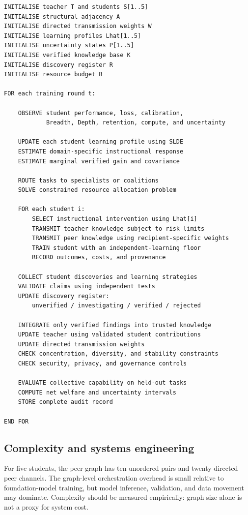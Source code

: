 \documentclass[11pt,a4paper]{article}
\begin{document}
\begin{verbatim}
INITIALISE teacher T and students S[1..5]
INITIALISE structural adjacency A
INITIALISE directed transmission weights W
INITIALISE learning profiles Lhat[1..5]
INITIALISE uncertainty states P[1..5]
INITIALISE verified knowledge base K
INITIALISE discovery register R
INITIALISE resource budget B

FOR each training round t:

    OBSERVE student performance, loss, calibration,
            Breadth, Depth, retention, compute, and uncertainty

    UPDATE each student learning profile using SLDE
    ESTIMATE domain-specific instructional response
    ESTIMATE marginal verified gain and covariance

    ROUTE tasks to specialists or coalitions
    SOLVE constrained resource allocation problem

    FOR each student i:
        SELECT instructional intervention using Lhat[i]
        TRANSMIT teacher knowledge subject to risk limits
        TRANSMIT peer knowledge using recipient-specific weights
        TRAIN student with an independent-learning floor
        RECORD outcomes, costs, and provenance

    COLLECT student discoveries and learning strategies
    VALIDATE claims using independent tests
    UPDATE discovery register:
        unverified / investigating / verified / rejected

    INTEGRATE only verified findings into trusted knowledge
    UPDATE teacher using validated student contributions
    UPDATE directed transmission weights
    CHECK concentration, diversity, and stability constraints
    CHECK security, privacy, and governance controls

    EVALUATE collective capability on held-out tasks
    COMPUTE net welfare and uncertainty intervals
    STORE complete audit record

END FOR
\end{verbatim}

\subsection{Complexity and systems engineering}

For five students, the peer graph has ten unordered pairs and twenty directed peer channels. The graph-level orchestration overhead is small relative to foundation-model training, but model inference, validation, and data movement may dominate. Complexity should be measured empirically: graph size alone is not a proxy for system cost.
\end{document}
